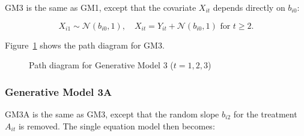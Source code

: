 \documentclass[
  12pt,
  a4paper,
]{article}
\begin{document}
GM3 is the same as GM1, except that the covariate \(X_{it}\) depends
directly on \(b_{i0}\):

\[
X_{i1} \sim \mathcal{N}(b_{i0}, 1), \quad X_{it} = Y_{it} + \mathcal{N}(b_{i0}, 1) \text{ for } t \geq 2.
\]

Figure~\ref{fig-GM3_path} shows the path diagram for GM3.

\begin{figure}[H]

\caption{\label{fig-GM3_path}Path diagram for Generative Model 3
(\(t = 1, 2, 3\))}


\end{figure}%

\subsubsection{Generative Model 3A}\label{generative-model-3a}

GM3A is the same as GM3, except that the random slope \(b_{i2}\) for the
treatment \(A_{it}\) is removed. The single equation model then becomes:
\end{document}
